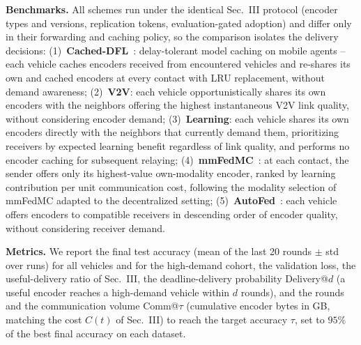 \textbf{Benchmarks.}
All schemes run under the identical Sec.~III protocol (encoder types
and versions, replication tokens, evaluation-gated adoption) and
differ only in their forwarding and caching policy, so the comparison
isolates the delivery decisions:
(1)~\textbf{Cached-DFL}~\cite{cachedDFL}: delay-tolerant
model caching on mobile agents -- each vehicle caches encoders
received from encountered vehicles and re-shares its own and cached
encoders at every contact with LRU replacement, without demand
awareness;
(2)~\textbf{V2V}: each vehicle opportunistically shares its own
encoders with the neighbors offering the highest instantaneous V2V
link quality, without considering encoder demand;
(3)~\textbf{Learning}: each vehicle shares its own encoders directly
with the neighbors that currently demand them, prioritizing receivers
by expected learning benefit regardless of link quality, and performs
no encoder caching for subsequent relaying;
(4)~\textbf{mmFedMC}~\cite{multimodal_tmc}: at each contact, the
sender offers only its highest-value own-modality encoder, ranked by
learning contribution per unit communication cost, following the
modality selection of mmFedMC adapted to the decentralized setting;
(5)~\textbf{AutoFed}~\cite{autofed}: each vehicle offers encoders to
compatible receivers in descending order of encoder quality, without
considering receiver demand.

\textbf{Metrics.}
We report the final test accuracy (mean of the last 20 rounds
$\pm$ std over runs) for all vehicles and for the high-demand cohort,
the validation loss, the useful-delivery ratio of Sec.~III, the
deadline-delivery probability Delivery@$d$ (a useful encoder reaches a
high-demand vehicle within $d$ rounds), and the rounds and the
communication volume Comm@$\tau$ (cumulative encoder bytes in GB,
matching the cost $C(t)$ of Sec.~III) to reach the target accuracy
$\tau$, set to $95\%$ of the best final accuracy on each dataset.
